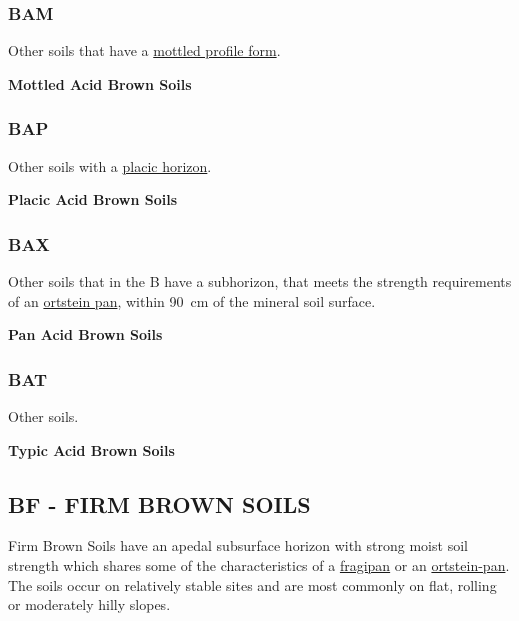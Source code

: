 \documentclass[
  letterpaper,
  DIV=11,
  numbers=noendperiod]{scrreprt}
\begin{document}
\hypertarget{sec-key-BAM}{%
\subsubsection{\texorpdfstring{\textbf{BAM}}{BAM}}\label{sec-key-BAM}}

Other soils that have a \protect\hyperlink{sec-diag-mottpf}{mottled
profile form}.

\textbf{Mottled Acid Brown Soils}

\hypertarget{sec-key-BAP}{%
\subsubsection{\texorpdfstring{\textbf{BAP}}{BAP}}\label{sec-key-BAP}}

Other soils with a \protect\hyperlink{sec-diag-plac}{placic horizon}.

\textbf{Placic Acid Brown Soils}

\hypertarget{sec-key-BAX}{%
\subsubsection{\texorpdfstring{\textbf{BAX}}{BAX}}\label{sec-key-BAX}}

Other soils that in the B have a subhorizon, that meets the strength
requirements of an \protect\hyperlink{sec-diag-opan}{ortstein pan},
within 90~cm of the mineral soil surface.

\textbf{Pan Acid Brown Soils}

\hypertarget{sec-key-BAT}{%
\subsubsection{\texorpdfstring{\textbf{BAT}}{BAT}}\label{sec-key-BAT}}

Other soils.

\textbf{Typic Acid Brown Soils}

\hypertarget{sec-BF}{%
\subsection{\texorpdfstring{\textbf{BF} - FIRM BROWN
SOILS}{BF - FIRM BROWN SOILS}}\label{sec-BF}}

Firm Brown Soils have an apedal subsurface horizon with strong moist
soil strength which shares some of the characteristics of a
\protect\hyperlink{sec-diag-fpan}{fragipan} or an
\protect\hyperlink{sec-diag-opan}{ortstein-pan}. The soils occur on
relatively stable sites and are most commonly on flat, rolling or
moderately hilly slopes.
\end{document}
